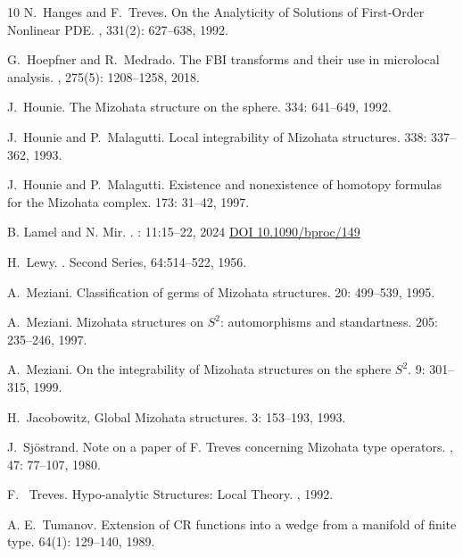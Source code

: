 \documentclass[11pt]{amsart}
\theoremstyle{definition}
\theoremstyle{remark}
\theoremstyle{plain}
\begin{document}
\begin{thebibliography}{10}
N.~Hanges and F.~Treves.
\newblock  On the Analyticity of Solutions of First-Order Nonlinear PDE.
, 331(2): 627--638, 1992.

G.~Hoepfner and R.~Medrado.
\newblock The FBI transforms and their use in microlocal analysis.
, 275(5): 1208--1258, 2018.

J.~Hounie.
\newblock The {M}izohata structure on the sphere.
 334: 641--649, 1992.

J.~Hounie and P.~Malagutti.
\newblock Local integrability of {M}izohata structures.
 338: 337--362, 1993.

J.~Hounie and P.~Malagutti.
\newblock Existence and nonexistence of homotopy formulas for the {M}izohata complex.
 173: 31--42, 1997.

 B. Lamel and N. Mir.
.
: 11:15–22, 2024
\href{https://doi.org/10.1090/bproc/149}{DOI 10.1090/bproc/149}


  H.~Lewy.
  .
  Second Series, 64:514–522, 1956.



A.~Meziani.
\newblock Classification of germs of {M}izohata structures.
 20: 499--539, 1995.

A.~Meziani.
\newblock Mizohata structures on {$S^2$}: automorphisms and standartness.
 205: 235--246, 1997.

A.~Meziani.
\newblock On the integrability of {M}izohata structures on the sphere {$S^2$}.
 9: 301--315, 1999.

H.~Jacobowitz,
\newblock Global {M}izohata structures.
 3: 153--193, 1993.

J.~Sj\"{o}strand.
\newblock Note on a paper of {F}. {T}reves concerning {M}izohata type operators.
, 47: 77--107, 1980.

F. ~Treves.
\newblock Hypo-analytic {Structures}: {L}ocal {T}heory.
, 1992.

A. E.~Tumanov.
\newblock Extension of CR functions into a wedge from a manifold of finite type. 
 64(1): 129--140, 1989.


\end{thebibliography}
\end{document}
